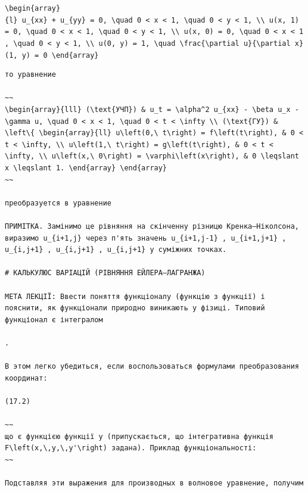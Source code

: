 \documentclass[
  ukrainian,
]{article}
\begin{document}
\texttt{\textbackslash{}begin\{array\}\{l\}\ u\_\{xx\}\ +\ u\_\{yy\}\ =\ 0,\ \textbackslash{}quad\ 0\ \textless{}\ x\ \textless{}\ 1,\ \textbackslash{}quad\ 0\ \textless{}\ y\ \textless{}\ 1,\ \textbackslash{}\textbackslash{}\ u(x,\ 1)\ =\ 0,\ \textbackslash{}quad\ 0\ \textless{}\ x\ \textless{}\ 1,\ \textbackslash{}quad\ 0\ \textless{}\ y\ \textless{}\ 1,\ \textbackslash{}\textbackslash{}\ u(x,\ 0)\ =\ 0,\ \textbackslash{}quad\ 0\ \textless{}\ x\ \textless{}\ 1,\ \textbackslash{}quad\ 0\ \textless{}\ y\ \textless{}\ 1,\ \textbackslash{}\textbackslash{}\ u(0,\ y)\ =\ 1,\ \textbackslash{}quad\ \textbackslash{}frac\{\textbackslash{}partial\ u\}\{\textbackslash{}partial\ x\}(1,\ y)\ =\ 0\ \textbackslash{}end\{array\}}

\begin{verbatim}
то уравнение

~~
\begin{array}{lll} (\text{УЧП}) & u_t = \alpha^2 u_{xx} - \beta u_x - \gamma u, \quad 0 < x < 1, \quad 0 < t < \infty \\ (\text{ГУ}) & \left\{ \begin{array}{ll} u\left(0,\ t\right) = f\left(t\right), & 0 < t < \infty, \\ u\left(1,\ t\right) = g\left(t\right), & 0 < t < \infty, \\ u\left(x,\ 0\right) = \varphi\left(x\right), & 0 \leqslant x \leqslant 1. \end{array} \end{array}
~~

преобразуется в уравнение

ПРИМІТКА. Замінимо це рівняння на скінченну різницю Кренка–Ніколсона, виразимо u_{i+1,j} через п'ять значень u_{i+1,j-1} , u_{i+1,j+1} , u_{i,j+1} , u_{i,j+1} , u_{i,j+1} у суміжних точках.

# КАЛЬКУЛЮС ВАРІАЦІЙ (РІВНЯННЯ ЕЙЛЕРА–ЛАГРАНЖА)

МЕТА ЛЕКЦІЇ: Ввести поняття функціоналу (функцію з функції) і пояснити, як функціонали природно виникають у фізиці. Типовий функціонал є інтегралом

.

В этом легко убедиться, если воспользоваться формулами преобразования координат:

(17.2)

~~
що є функцією функції y (припускається, що інтегративна функція F\left(x,\,y,\,y'\right) задана). Приклад функціональності:
~~

Подставляя эти выражения для производных в волновое уравнение, получим


\end{verbatim}
\end{document}
